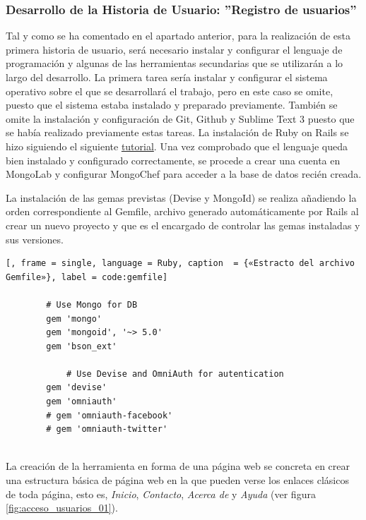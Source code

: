 	\subsubsection{Desarrollo de la Historia de Usuario: ''Registro de usuarios'' }
	Tal y como se ha comentado en el apartado anterior, para la realización de esta primera historia de usuario, será necesario instalar y configurar el lenguaje de programación y algunas de las herramientas secundarias que se utilizarán a lo largo del desarrollo.
	La primera tarea sería instalar y configurar el sistema operativo sobre el que se desarrollará el trabajo, pero en este caso se omite, puesto que el sistema estaba instalado y preparado previamente. También se omite la instalación y configuración de Git, Github y Sublime Text 3 puesto que se había realizado previamente estas tareas.
	La instalación de Ruby on Rails se hizo siguiendo el siguiente \href{http://railsapps.github.io/installrubyonrails-ubuntu.html}{tutorial}.
	Una vez comprobado que el lenguaje queda bien instalado y configurado correctamente, se procede a crear una cuenta en MongoLab y configurar MongoChef para acceder a la base de datos recién creada.
	
	La instalación de las gemas previstas (Devise y MongoId) se realiza añadiendo la orden correspondiente al Gemfile, archivo generado automáticamente por Rails al crear un nuevo proyecto y que es el encargado de controlar las gemas instaladas y sus versiones.
	
	\begin{lstlisting}[, frame = single, language = Ruby, caption  = {«Estracto del archivo Gemfile»}, label = code:gemfile]
		
		# Use Mongo for DB
		gem 'mongo'
		gem 'mongoid', '~> 5.0'
		gem 'bson_ext'
		
			# Use Devise and OmniAuth for autentication
		gem 'devise'
		gem 'omniauth'
		# gem 'omniauth-facebook'
		# gem 'omniauth-twitter'
		
	\end{lstlisting}
	
	La creación de la herramienta en forma de una página web se concreta en crear una estructura básica de página web en la que pueden verse los enlaces clásicos de toda página, esto es, \textit{Inicio}, \textit{Contacto}, \textit{Acerca de} y \textit{Ayuda} (ver figura \ref{fig:acceso_usuarios_01}).\\
	
